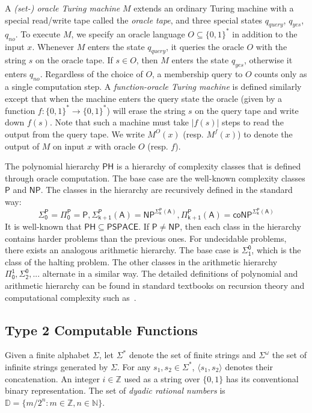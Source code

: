 \documentclass[10pt]{article}
\theoremstyle{plain}
\theoremstyle{definition}
\newcommand{\np}{\mathsf{NP}}
\begin{document}
A {\em (set-) oracle Turing machine} $M$ extends an ordinary Turing machine with a special read/write tape called the {\em oracle tape}, and three special states $q_{\mathit{query}}$, $q_{\mathit{yes}}$, $q_{\mathit{no}}$. To execute $M$, we specify an oracle language $O\subseteq \{0,1\}^*$ in addition to the input $x$. Whenever $M$ enters the state $q_{\mathit{query}}$, it queries the oracle $O$ with the string $s$ on the oracle tape. If $s\in O$, then $M$ enters the state $q_{\mathit{yes}}$, otherwise it enters $q_{\mathit{no}}$. Regardless of the choice of $O$, a membership query to $O$ counts only as a single computation step. A {\em function-oracle Turing machine} is defined similarly except that when the machine enters the query state the oracle (given by a function $f:\{0,1\}^*\rightarrow\{0,1\}^*$) will erase the string $s$ on the query tape and write down $f(s)$. Note that such a machine must take $|f(s)|$ steps to read the output from the query tape. We write $M^O(x)$ (resp. $M^f(x)$) to denote the output of $M$ on input $x$ with oracle $O$ (resp. $f$). 

The polynomial hierarchy $\mathsf{PH}$ is a hierarchy of complexity classes that is defined through oracle computation. The base case are the well-known complexity classes $\mathsf{P}$ and $\np$. The classes in the hierarchy are recursively defined in the standard way:  
$$
\mathsf{\Sigma_0^P} = \mathsf{\Pi_0^P} = \mathsf{P}, \mathsf{\Sigma_{k+1}^P(A)} =\mathsf{NP^{\Sigma_k^P(A)}}, \mathsf{\Pi_{k+1}^P(A)}= \mathsf{coNP^{\Sigma_{k}^P(A)}}
$$
It is well-known that $\mathsf{PH}\subseteq \mathsf{PSPACE}$. If $\mathsf{P}\neq \mathsf{NP}$, then each class in the hierarchy contains harder problems than the previous ones. For undecidable problems, there exists an analogous arithmetic hierarchy. The base case is $\mathsf{\Sigma_1^0}$, which is the class of the halting problem. The other classes in the arithmetic hierarchy $\mathsf{\Pi_0^1}, \mathsf{\Sigma_2^0}, ...$ alternate in a similar way. The detailed definitions of polynomial and arithmetic hierarchy can be found in standard textbooks on recursion theory and computational complexity such as~\cite{arora09}. 

\subsection{Type 2 Computable Functions}

Given a finite alphabet $\Sigma$, let $\Sigma^*$ denote the set of finite strings and $\Sigma^{\omega}$ the set of infinite strings generated by $\Sigma$. For any $s_1, s_2\in \Sigma^*$, $\langle s_1,s_2\rangle$ denotes their concatenation. An integer $i\in \mathbb{Z}$ used as a string over $\{0,1\}$ has its conventional binary representation. The set of {\em dyadic rational numbers} is $\mathbb{D} = \{m/2^n: m\in \mathbb{Z}, n\in \mathbb{N}\}$. 
\end{document}
